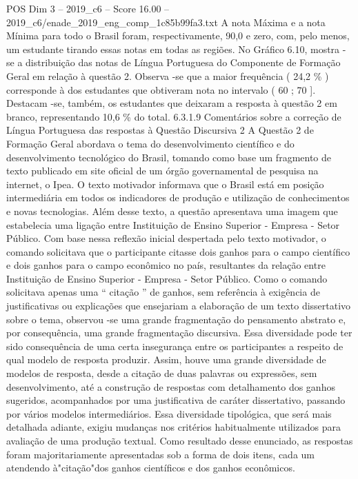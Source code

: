 \begin{textsample}{POS Dim 3 – 2019\_c6 – Score 16.00 – 2019\_c6/enade\_2019\_eng\_comp\_1c85b99fa3.txt}
A nota Máxima e a nota Mínima para todo o Brasil foram, respectivamente, 90,0 e zero, com, pelo menos, um estudante tirando essas notas em todas as regiões.
No Gráfico 6.10, mostra -se a distribuição das notas de Língua Portuguesa do Componente de Formação Geral em relação à questão 2.
Observa -se que a maior frequência ( 24,2 \% ) corresponde à dos estudantes que obtiveram nota no intervalo ( 60 ; 70 ].
Destacam -se, também, os estudantes que deixaram a resposta à questão 2 em branco, representando 10,6 \% do total. 6.3.1.9 Comentários sobre a correção de Língua Portuguesa das respostas à Questão Discursiva 2 A Questão 2 de Formação Geral abordava o tema do desenvolvimento científico e do desenvolvimento tecnológico do Brasil, tomando como base um fragmento de texto publicado em site oficial de um órgão governamental de pesquisa na internet, o Ipea.
O texto motivador informava que o Brasil está em posição intermediária em todos os indicadores de produção e utilização de conhecimentos e novas tecnologias.
Além desse texto, a questão apresentava uma imagem que estabelecia uma ligação entre Instituição de Ensino Superior - Empresa - Setor Público.
Com base nessa reflexão inicial despertada pelo texto motivador, o comando solicitava que o participante citasse dois ganhos para o campo científico e dois ganhos para o campo econômico no país, resultantes da relação entre Instituição de Ensino Superior - Empresa - Setor Público.
Como o comando solicitava apenas uma “ citação ” de ganhos, sem referência à exigência de justificativas ou explicações que ensejariam a elaboração de um texto dissertativo sobre o tema, observou -se uma grande fragmentação do pensamento abstrato e, por consequência, uma grande fragmentação discursiva.
Essa diversidade pode ter sido consequência de uma certa insegurança entre os participantes a respeito de qual modelo de resposta produzir.
Assim, houve uma grande diversidade de modelos de resposta, desde a citação de duas palavras ou expressões, sem desenvolvimento, até a construção de respostas com detalhamento dos ganhos sugeridos, acompanhados por uma justificativa de caráter dissertativo, passando por vários modelos intermediários.
Essa diversidade tipológica, que será mais detalhada adiante, exigiu mudanças nos critérios habitualmente utilizados para avaliação de uma produção textual.
Como resultado desse enunciado, as respostas foram majoritariamente apresentadas sob a forma de dois itens, cada um atendendo à"citação"dos ganhos científicos e dos ganhos econômicos.

\end{textsample}
